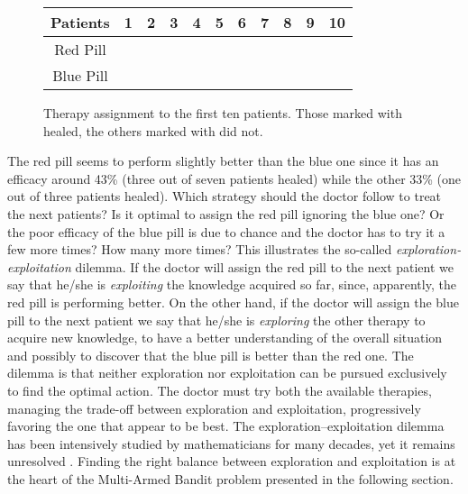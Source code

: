 \begin{figure}[t!]
	\centering
	\begin{tabular}{|c|l|lcccccccccc|}
		\hline
		\multicolumn{3}{|c}{\textbf{Patients}} & 1      & 2      & 3      & 4      & 5      & 6      & 7      & 8      & 9      & 10     \\ \hline
		\multicolumn{3}{|c}{Red Pill}          & \xmark &        &        & \xmark &        & \cmark & \cmark & \cmark & \xmark & \xmark \\
		\multicolumn{3}{|c}{Blue Pill}         &        & \cmark & \xmark &        & \xmark &        &        &        &        &        \\ \hline
	\end{tabular}
	
	\caption{Therapy assignment to the first ten patients. Those marked with \cmark healed, the others marked with \xmark  did not. }
	\label{f:clinical}
\end{figure}
The red pill seems to perform slightly better than the blue one since it has an efficacy around 43\% (three out of seven patients healed) while the other 33\% (one out of three patients healed). Which strategy should the doctor follow to treat the next patients? Is it optimal to assign the red pill ignoring the blue one? Or the poor efficacy of the blue pill is due to chance and the doctor has to try it a few more times? How many more times? This illustrates the so-called 	\emph{exploration-exploitation} dilemma. If the doctor will assign the red pill to the next patient we say that he/she is \emph{exploiting} the knowledge acquired so far, since, apparently, the red pill is performing better. On the other hand, if the doctor will assign the blue pill to the next patient we say that he/she is \emph{exploring} the other therapy to acquire new knowledge, to have a better understanding of the overall situation and possibly to discover that the blue pill is better than the red one. The dilemma is that neither exploration nor exploitation can be pursued exclusively to find the optimal action. The doctor must try both the available therapies, managing the trade-off between exploration and exploitation, progressively favoring the one that appear to be best. The exploration–exploitation dilemma has been intensively studied by mathematicians for many decades, yet it remains unresolved \citep{sutton2018reinforcement}. Finding the right balance between exploration and exploitation is at the heart of the Multi-Armed Bandit problem presented in the following section.

